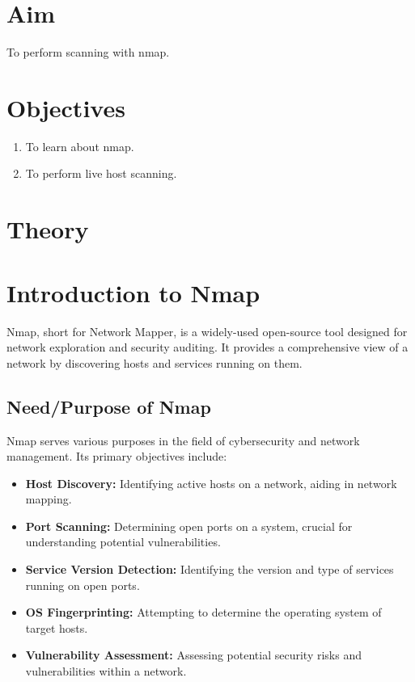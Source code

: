 \documentclass[11pt]{article}
\begin{document}
\tableofcontents
\thispagestyle{empty}
\clearpage

\setcounter{page}{1}

\section{Aim}
To perform scanning with nmap.

\section{Objectives}
\begin{enumerate}
    \item To learn about nmap.
    \item To perform live host scanning.
\end{enumerate}

\section{Theory}
\section{Introduction to Nmap}
Nmap, short for Network Mapper, is a widely-used open-source tool designed for network exploration and security auditing. It provides a comprehensive view of a network by discovering hosts and services running on them.

\subsection{Need/Purpose of Nmap}
Nmap serves various purposes in the field of cybersecurity and network management. Its primary objectives include:

\begin{itemize}
    \item \textbf{Host Discovery:} Identifying active hosts on a network, aiding in network mapping.
    \item \textbf{Port Scanning:} Determining open ports on a system, crucial for understanding potential vulnerabilities.
    \item \textbf{Service Version Detection:} Identifying the version and type of services running on open ports.
    \item \textbf{OS Fingerprinting:} Attempting to determine the operating system of target hosts.
    \item \textbf{Vulnerability Assessment:} Assessing potential security risks and vulnerabilities within a network.
\end{itemize}
\end{document}
